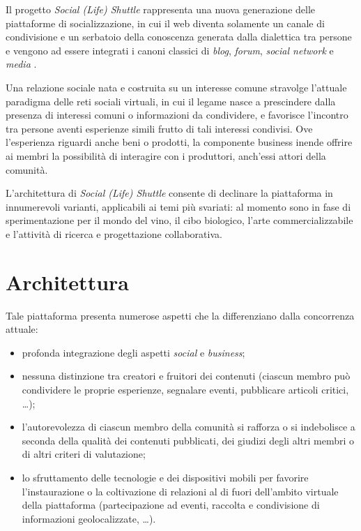 Il progetto \textit{Social (Life) Shuttle} rappresenta una nuova generazione delle piattaforme di socializzazione, in cui il web diventa solamente un canale di condivisione e un serbatoio della conoscenza generata dalla dialettica tra persone e vengono ad essere integrati i canoni classici di \textit{blog}, \textit{forum}, \textit{social network} e \textit{media} .

Una relazione sociale nata e costruita su un interesse comune stravolge l'attuale paradigma delle reti sociali virtuali, in cui il legame nasce a prescindere dalla presenza di interessi comuni o informazioni da condividere, e favorisce l'incontro tra persone aventi esperienze simili frutto di tali interessi condivisi. Ove l'esperienza riguardi anche beni o prodotti, la componente business inende offrire ai membri la possibilità di interagire con i produttori, anch'essi attori della comunità.

L'architettura di \textit{Social (Life) Shuttle} consente di declinare la piattaforma in innumerevoli varianti, applicabili ai temi più svariati: al momento sono in fase di sperimentazione per il mondo del vino, il cibo biologico, l'arte commercializzabile e l'attività di ricerca e progettazione collaborativa. 

\section{Architettura}
\label{sec:tesi:progetto:architettura}
Tale piattaforma presenta numerose aspetti che la differenziano dalla concorrenza attuale:
\begin{itemize}
	\item profonda integrazione degli aspetti \textit{social} e \textit{business};
	\item nessuna distinzione tra creatori e fruitori dei contenuti (ciascun membro può condividere le proprie esperienze, segnalare eventi, pubblicare articoli critici, \ldots);
	\item l'autorevolezza di ciascun membro della comunità si rafforza o si indebolisce a seconda della qualità dei contenuti pubblicati, dei giudizi degli altri membri o di altri criteri di valutazione;
	\item lo sfruttamento delle tecnologie e dei dispositivi mobili per favorire l'instaurazione o la coltivazione di relazioni al di fuori dell'ambito virtuale della piattaforma (partecipazione ad eventi, raccolta e condivisione di informazioni geolocalizzate, \ldots).
\end{itemize}  

